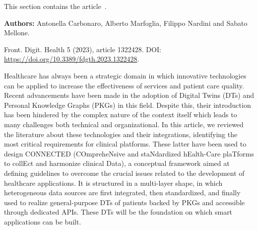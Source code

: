 
\noindent This section contains the article~\cite{10.3389/fdgth.2023.1322428_carbonaro_connected}.

\begin{paperheader}
\textbf{Authors:} Antonella Carbonaro, Alberto Marfoglia, Filippo Nardini and Sabato Mellone.\par
Front. Digit. Health 5 (2023), article 1322428. DOI: \url{https://doi.org/10.3389/fdgth.2023.1322428}.
\end{paperheader}

\begin{paperabstract}

Healthcare has always been a strategic domain in which innovative technologies can be applied to increase the effectiveness of services and patient care quality. Recent advancements have been made in the adoption of Digital Twins (DTs) and Personal Knowledge Graphs (PKGs) in this field. Despite this, their introduction has been hindered by the complex nature of the context itself which leads to many challenges both technical and organizational. In this article, we reviewed the literature about these technologies and their integrations, identifying the most critical requirements for clinical platforms. These latter have been used to design CONNECTED (COmpreheNsive and staNdardized hEalth-Care plaTforms to collEct and harmonize clinical Data), a conceptual framework aimed at defining guidelines to overcome the crucial issues related to the development of healthcare applications. It is structured in a multi-layer shape, in which heterogeneous data sources are first integrated, then standardized, and finally used to realize general-purpose DTs of patients backed by PKGs and accessible through dedicated APIs. These DTs will be the foundation on which smart applications can be built.
\end{paperabstract}

